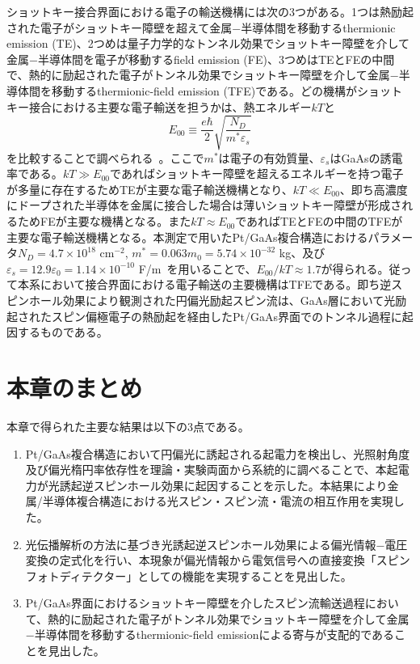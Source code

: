 ショットキー接合界面における電子の輸送機構には次の3つがある。1つは熱励起された電子がショットキー障壁を超えて金属−半導体間を移動するthermionic emission (TE)、2つめは量子力学的なトンネル効果でショットキー障壁を介して金属−半導体間を電子が移動するfield emission (FE)、3つめはTEとFEの中間で、熱的に励起された電子がトンネル効果でショットキー障壁を介して金属−半導体間を移動するthermionic-field emission (TFE)である。どの機構がショットキー接合における主要な電子輸送を担うかは、熱エネルギー$kT$と
\begin{equation}
E_{00}\equiv \frac{e\hbar}{2}\sqrt{\frac{N_D}{m^* \varepsilon _s}}
\end{equation}
を比較することで調べられる~\cite{Padovani,Cohen,Sze}。ここで$m^*$は電子の有効質量、$\varepsilon _s$はGaAsの誘電率である。$kT\gg E_{00}$であればショットキー障壁を超えるエネルギーを持つ電子が多量に存在するためTEが主要な電子輸送機構となり、$kT\ll E_{00}$、即ち高濃度にドープされた半導体を金属に接合した場合は薄いショットキー障壁が形成されるためFEが主要な機構となる。また$kT\approx E_{00}$であればTEとFEの中間のTFEが主要な電子輸送機構となる。本測定で用いたPt/GaAs複合構造におけるパラメータ$N_D=4.7\times 10^{18}$ cm$^{-2}$, $m^*=0.063 m_0=5.74\times 10^{-32}$ kg、及び$\varepsilon _s=12.9\varepsilon _0=1.14\times 10^{-10}$ F/m~\cite{Sze}を用いることで、$E_{00}/kT\approx 1.7$が得られる。従って本系において接合界面における電子輸送の主要機構はTFEである。即ち逆スピンホール効果により観測された円偏光励起スピン流は、GaAs層において光励起されたスピン偏極電子の熱励起を経由したPt/GaAs界面でのトンネル過程に起因するものである。




\section{本章のまとめ}
本章で得られた主要な結果は以下の3点である。
\begin{enumerate}
 \item Pt/GaAs複合構造において円偏光に誘起される起電力を検出し、光照射角度及び偏光楕円率依存性を理論・実験両面から系統的に調べることで、本起電力が光誘起逆スピンホール効果に起因することを示した。本結果により金属/半導体複合構造における光スピン・スピン流・電流の相互作用を実現した。
 \item 光伝播解析の方法に基づき光誘起逆スピンホール効果による偏光情報−電圧変換の定式化を行い、本現象が偏光情報から電気信号への直接変換「スピンフォトディテクター」としての機能を実現することを見出した。
 \item Pt/GaAs界面におけるショットキー障壁を介したスピン流輸送過程において、熱的に励起された電子がトンネル効果でショットキー障壁を介して金属−半導体間を移動するthermionic-field emissionによる寄与が支配的であることを見出した。
\end{enumerate}
